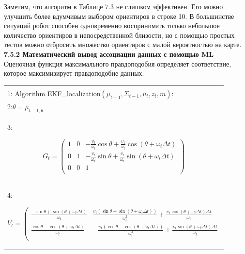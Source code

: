 \documentclass[10pt,a4paper]{article}
\begin{document}
Заметим, что алгоритм в Таблице 7.3 не слишком эффективен. Его можно улучшить более вдумчивым выбором ориентиров в строке 10. В большинстве ситуаций робот способен одновременно воспринимать только небольшое количество ориентиров в непосредственной близости, но с помощью простых тестов можно отбросить множество ориентиров с малой вероятностью на карте. \\

\textbf{7.5.2 Математический вывод ассоциации данных с помощью ML} \\

Оценочная функция максимального правдоподобия определяет соответствие, которое максимизирует правдоподобие данных.

\begin{table}[H]
\begin{center}
\begin{tabular}{|l|}
\hline
{}\\
1: Algorithm EKF\_localization$(\mu_{t-1},\varSigma_{t-1},u_t,z_t,m):$ \\
2:\hspace{5mm}$\theta=\mu_{t-1,\theta}$\\
3:\hspace{5mm}
\begin{minipage}{0.2\textwidth}
\begin{equation*}
G_t=
\left(\begin{array}{ccc}
1&0&-\frac{\upsilon_t}{\omega_t}\cos\theta+\frac{\upsilon_t}{\omega_t}\cos(\theta+\omega_t\varDelta t)\\
0&1&-\frac{\upsilon_t}{\omega_t}\sin\theta+\frac{\upsilon_t}{\omega_t}\sin(\theta+\omega_t\varDelta t)\\
0&0&1\\
\end{array}\right)
\end{equation*}
\end{minipage}\\
4:\hspace{5mm}
\begin{minipage}{0.2\textwidth}
\begin{equation*}
V_t=
\left(\begin{array}{cc}
\frac{-\sin\theta+\sin(\theta+\omega_t\varDelta t)}{\omega_t}&\frac{\upsilon_t(\sin\theta-\sin(\theta+\omega_t\varDelta t))}{\omega_t^2}+\frac{\upsilon_t\cos(\theta+\omega_t\varDelta t)\varDelta t}{\omega_t}\\
\frac{\cos\theta-\cos(\theta+\omega_t\varDelta t)}{\omega_t}&-\frac{\upsilon_t(\cos\theta-\cos(\theta+\omega_t\varDelta t))}{\omega_t^2}+\frac{\upsilon_t\sin(\theta+\omega_t\varDelta t)\varDelta t}{\omega_t}\\

\end{array}
\end{equation*}
\end{minipage}
\end{tabular}
\end{center}
\end{table}
\end{document}
